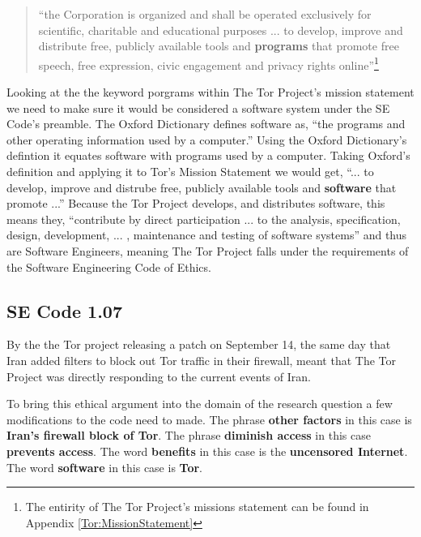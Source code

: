 \documentclass[11pt]{article}
\begin{document}
\begin{multicols}{2}
\begin{quotation}
  ``the Corporation is organized and shall be operated exclusively for scientific,
  charitable and educational purposes ... to develop, improve and distribute
  free, publicly available tools and \textbf{programs} that promote free speech, free
expression, civic engagement and privacy rights online''\footnote{ The entirity
of The Tor Project's missions statement can be found in Appendix
\ref{Tor:MissionStatement}} \cite{TOR:Sponsorship} 
\end{quotation}

Looking at the the keyword porgrams within The Tor Project's mission statement
we need to make sure it would be considered a software system under the SE
Code's preamble. The Oxford Dictionary defines software as, ``the programs and other operating
information used by a computer.''\cite{defn:Software} Using the Oxford
Dictionary's defintion it equates software with programs used by a computer.
Taking Oxford's definition and applying it to Tor's Mission Statement we would
get, ``... to develop, improve and distrube free, publicly available tools and
\textbf{software} that promote ...''
Because the Tor Project develops, and distributes software, this means they, ``contribute by
direct participation ...  to the analysis, specification, design, development,
... , maintenance and testing of software systems'' and thus are Software
Engineers, meaning The Tor Project falls under the requirements of the Software
Engineering Code of Ethics.\cite{Tor:FAQ, Tor:Overview} 


\subsection{SE Code 1.07} 

\newline

By the the Tor project releasing a patch on September 14, the same day that Iran
added filters to block out Tor traffic in their firewall, meant that The Tor
Project was directly responding to the current events of Iran.

To bring this ethical argument into the domain of the research question a few
modifications to the code need to made. The phrase \textbf{other factors} in
this case is \textbf{Iran's firewall block of Tor}. The phrase \textbf{diminish
access} in this case \textbf{prevents access}. The word \textbf{benefits} in
this case is the \textbf{uncensored Internet}. The word \textbf{software} in
this case is \textbf{Tor}.


\end{multicols}
\end{document}

